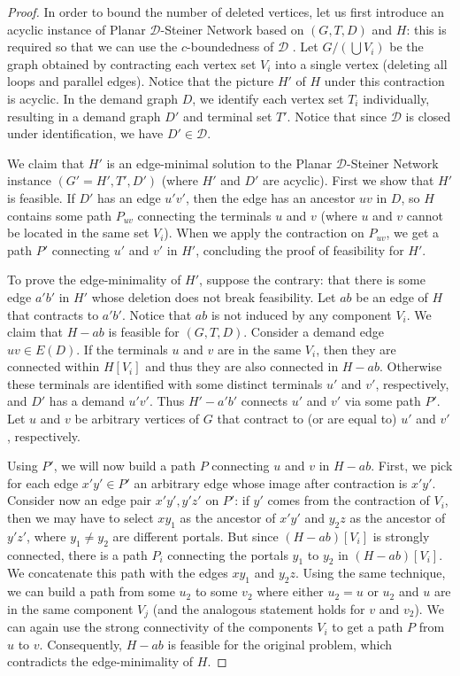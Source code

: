 \documentclass[a4paper,11pt]{article}
\newcommand{\calD}{\mathcal{D}}
\theoremstyle{plain}
\newtheorem{identification rule}{Identification Rule}
\theoremstyle{definition}
\theoremstyle{remark}
\newcommand{\Dsnfull}{{\sc Planar $\calD$-Steiner Network}\xspace}
\begin{document}
\begin{proof}
In order to bound the number of deleted vertices, let us first introduce an acyclic instance of \Dsnfull based on $(G,T,D)$ and $H$: this is required so that we can use the $c$-boundedness of $\calD$ . Let $G/(\bigcup V_i)$ be the graph obtained by contracting each vertex set $V_i$ into a single vertex (deleting all loops and parallel edges). Notice that the picture $H'$ of $H$ under this contraction is acyclic. In the demand graph $D$, we identify each vertex set $T_i$ individually, resulting in a demand graph $D'$ and terminal set $T'$. Notice that since $\calD$ is closed under identification, we have $D'\in \calD$. 

We claim that $H'$ is an edge-minimal solution to the 
\Dsnfull instance $(G'=H',T',D')$ (where $H'$ and $D'$ are acyclic). First we show that $H'$ is feasible. If $D'$ has an edge $u'v'$, then the edge has an ancestor $uv$ in $D$, so $H$ contains some path $P_{uv}$ connecting the terminals $u$ and $v$ (where $u$ and $v$ cannot be located in the same set $V_i$). When we apply the contraction on $P_{uv}$, we get a path $P'$ connecting $u'$ and $v'$ in $H'$, concluding the proof of feasibility for $H'$.

To prove the edge-minimality of $H'$, suppose the contrary: that there is some edge $a'b'$ in $H'$ whose deletion does not break feasibility. Let $ab$ be an edge of $H$ that contracts to $a'b'$. Notice that $ab$ is not induced by any component $V_i$. We claim that $H-ab$ is feasible for $(G,T,D)$. Consider a demand edge $uv\in E(D)$. If the terminals $u$ and $v$ are in the same $V_i$, then they are connected within $H[V_i]$ and thus they are also connected in $H-ab$. Otherwise these terminals are identified with some distinct terminals $u'$ and $v'$, respectively, and $D'$ has a demand $u'v'$. Thus $H'-a'b'$ connects $u'$ and $v'$ via some path $P'$. Let $u$ and $v$ be arbitrary vertices of $G$ that contract to (or are equal to) $u'$ and $v'$, respectively.

Using $P'$, we will now build a path $P$ connecting $u$ and $v$ in $H-ab$. First, we pick for each edge $x'y' \in P'$ an arbitrary edge whose image after contraction is $x'y'$. Consider now an edge pair $x'y', y'z'$ on $P'$: if $y'$ comes from the contraction of $V_i$, then we may have to select $xy_1$ as the ancestor of $x'y'$ and $y_2z$ as the ancestor of $y'z'$, where $y_1 \neq y_2$ are different portals. But since $(H-ab)[V_i]$ is strongly connected, there is a path $P_i$ connecting the portals $y_1$ to $y_2$ in $(H-ab)[V_i]$. We concatenate this path with the edges $xy_1$ and $y_2z$. Using the same technique, we can build a path from some $u_2$ to some $v_2$ where either $u_2=u$ or $u_2$ and $u$ are in the same component $V_j$ (and the analogous statement holds for $v$ and $v_2$). We can again use the strong connectivity of the components $V_i$ to get a path $P$ from $u$ to $v$. Consequently, $H-ab$ is feasible for the original problem, which contradicts the edge-minimality of $H$.


\end{proof}
\end{document}
